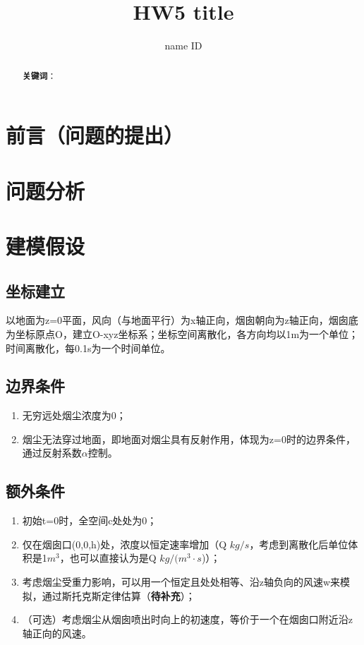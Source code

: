 \documentclass{article}
\title{\bfseries HW5 title}
\author{name \quad ID}
\begin{document}
	\maketitle
	\begin{abstract}
		
		\par \textbf{关键词}：
	\end{abstract}
	\setcounter{section}{0}
	
	\section{前言（问题的提出）}
	
	\section{问题分析}
	
	\section{建模假设}
	\setcounter{subsection}{0}
    \subsection{坐标建立}
    以地面为z=0平面，风向（与地面平行）为x轴正向，烟囱朝向为z轴正向，烟囱底为坐标原点O，建立O-xyz坐标系；坐标空间离散化，各方向均以1m为一个单位；时间离散化，每0.1s为一个时间单位。
    \subsection{边界条件}
    \begin{enumerate}
    \item 无穷远处烟尘浓度为0；
    \item 烟尘无法穿过地面，即地面对烟尘具有反射作用，体现为z=0时的边界条件，通过反射系数$\alpha$控制。
    \end{enumerate}
    \subsection{额外条件}
    \begin{enumerate}
    \item 初始t=0时，全空间c处处为0；
    \item 仅在烟囱口(0,0,h)处，浓度以恒定速率增加（Q $kg/s$，考虑到离散化后单位体积是1$m^3$，也可以直接认为是Q $kg/(m^3·s$)）；
    \item 考虑烟尘受重力影响，可以用一个恒定且处处相等、沿z轴负向的风速w来模拟，通过斯托克斯定律估算（\textbf{待补充}）；
    \item （可选）考虑烟尘从烟囱喷出时向上的初速度，等价于一个在烟囱口附近沿z轴正向的风速。
    \end{enumerate}
\end{document}
